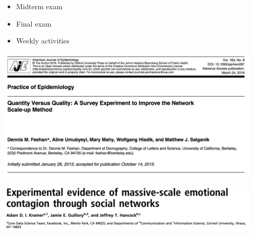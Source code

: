 \documentclass{beamer}
\def\vf{\vfill}
\begin{document}
\begin{frame}

\begin{itemize}
\item Midterm exam
\item Final exam
\item Weekly activities
\end{itemize}

\end{frame}
\begin{frame}

\begin{center}
\includegraphics[width=0.95\textwidth]{figures/feehan_quality_2016_title}
\end{center}

\vf
{}

\end{frame}
\begin{frame}

\begin{center}
\includegraphics[width=0.95\textwidth]{figures/kramer_experimental_2014_title}
\end{center}

\vf
{}

\end{frame}
\end{document}
